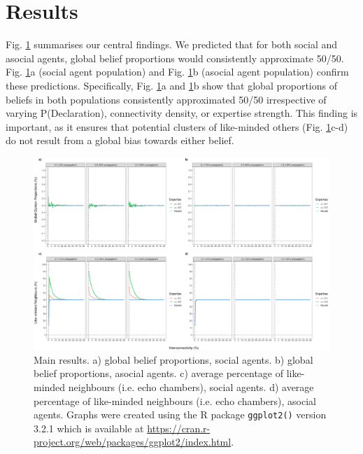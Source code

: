 \documentclass[fleqn,10pt]{wlscirep}
\begin{document}
\section*{Results}

Fig. \ref{fig:results} summarises our central findings. We predicted that for both social and asocial agents, global belief proportions would consistently approximate 50/50. Fig. \ref{fig:results}a (social agent population) and Fig. \ref{fig:results}b (asocial agent population) confirm these predictions. Specifically, Fig.  \ref{fig:results}a and \ref{fig:results}b show that global proportions of beliefs in both populations consistently approximated 50/50 irrespective of varying P(Declaration), connectivity density, or expertise strength. This finding is important, as it ensures that potential clusters of like-minded others (Fig. \ref{fig:results}c-d) do not result from a global bias towards either belief.

\begin{figure}[ht]
\centering
\includegraphics[width=1\columnwidth]{figure2.pdf}
\caption{Main results. a) global belief proportions, social agents. b) global belief proportions, asocial agents. c) average percentage of like-minded neighbours (i.e. echo chambers), social agents. d) average percentage of like-minded neighbours (i.e. echo chambers), asocial agents. Graphs were created using the R package {\tt ggplot2()} version 3.2.1 which is available at \href{https://cran.r-project.org/web/packages/ggplot2/index.html}{https://cran.r-project.org/web/packages/ggplot2/index.html}.}
\label{fig:results}
\end{figure}
\end{document}

